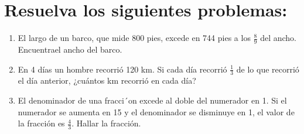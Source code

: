 \documentclass{article}
\begin{document}
\section*{Resuelva los siguientes problemas:}

\begin{enumerate}
    \item  El largo de un barco, que mide 800 pies, excede en 744 pies a los $\frac{8}{9}$ del ancho. Encuentrael ancho del barco.
    \item  En 4 días un hombre recorrió 120 km. Si cada día recorrió $\frac{1}{3}$ de lo que recorrió el día anterior, ¿cuántos km recorrió en cada día?
    \item El denominador de una fracci´on excede al doble del numerador en 1. Si el numerador se aumenta en 15 y el denominador se disminuye en 1, el valor de la fracción es $\frac{4}{3}$. Hallar la fracción.
\end{enumerate}
\end{document}
